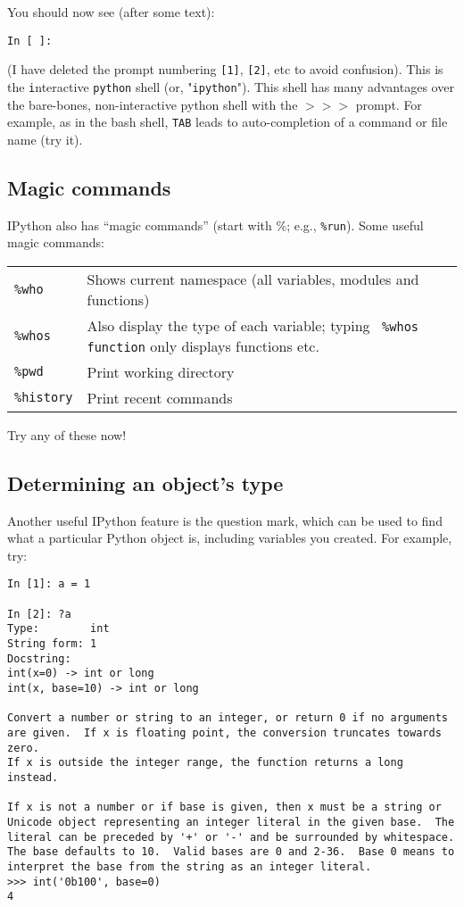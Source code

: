 You should now see (after some text):

\begin{lstlisting}
In [ ]: 
\end{lstlisting}
(I have deleted the prompt numbering {\tt [1]}, {\tt [2]}, etc to avoid 
confusion). This is the {\tt i}nteractive {\tt python} shell (or, "{\tt ipython}"). 
This shell has many advantages over the bare-bones, non-interactive 
python shell with the $>>>$ prompt. For example, as in the bash shell, 
{\tt TAB} leads to auto-completion of a command or file name (try it).

\subsection{Magic commands}
IPython also has ``magic commands'' (start with \%; e.g., {\tt \%run}). 
Some useful magic commands:

\begin{tabular}{p{2.5cm} p{10cm}} 
	{\tt \%who} & Shows current namespace (all variables, modules and 
	functions)\\
	{\tt \%whos} & Also display the type of each variable; typing {\tt 
	\%whos function} only displays functions etc.\\
  {\tt \%pwd} & Print working directory\\
	{\tt \%history} & Print recent commands\\
\end{tabular}

Try any of these now!
 
\subsection{Determining an object's type}
Another useful IPython feature is the question mark, which can be used 
to find what a particular Python object is, including variables you 
created. For example, try: 
\begin{lstlisting}
In [1]: a = 1

In [2]: ?a
Type:        int
String form: 1
Docstring:
int(x=0) -> int or long
int(x, base=10) -> int or long

Convert a number or string to an integer, or return 0 if no arguments
are given.  If x is floating point, the conversion truncates towards zero.
If x is outside the integer range, the function returns a long instead.

If x is not a number or if base is given, then x must be a string or
Unicode object representing an integer literal in the given base.  The
literal can be preceded by '+' or '-' and be surrounded by whitespace.
The base defaults to 10.  Valid bases are 0 and 2-36.  Base 0 means to
interpret the base from the string as an integer literal.
>>> int('0b100', base=0)
4
\end{lstlisting}

